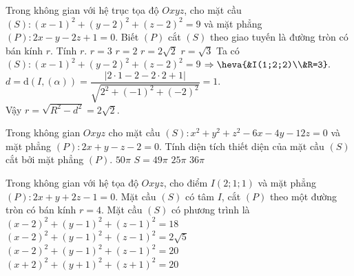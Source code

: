 \begin{ex}%
	Trong không gian với hệ trục tọa độ $Oxyz$, cho mặt cầu $(S) \colon (x-1)^2+(y-2)^2+(z-2)^2=9$ và mặt phẳng $(P) \colon 2x-y-2z+1=0$. Biết $(P)$ cắt $(S)$ theo giao tuyến là đường tròn có bán kính $r$. Tính $r$.
	\choice
	{$r=3$}
	{$r=2$}
	{\True $r=2\sqrt{2}$}
	{$r=\sqrt{3}$}
	\loigiai
	{Ta có $(S) \colon (x-1)^2+(y-2)^2+(z-2)^2=9$ $\Rightarrow \heva{&I(1;2;2)\\&R=3}.$\\ $d=\mathrm{d}\left(I,(\alpha)\right)=\dfrac{|2\cdot1-2-2\cdot2+1|}{\sqrt{2^2+(-1)^2+(-2)^2}}=1.$\\
		Vậy	$r=\sqrt{R^2-d^2}=2\sqrt{2}$.}
\end{ex}

\begin{ex}%
	Trong không gian $Oxyz$ cho mặt cầu $(S)\colon x^2+y^2+z^2-6x-4y-12z=0$ và mặt phẳng $(P)\colon 2x+y-z-2=0$. Tính diện tích thiết diện của mặt cầu $(S)$ cắt bởi mặt phẳng $(P)$.
	\choice
	{$50\pi $}
	{\True $S=49\pi $}
	{$25\pi $}
	{$36\pi $}
\end{ex}

\begin{ex}%
	Trong không gian với hệ tọa độ $Oxyz$, cho điểm $I(2;1;1)$ và mặt phẳng $(P)\colon 2x+y+2z-1=0$. Mặt cầu $(S)$ có tâm $I$, cắt $(P)$ theo một đường tròn có bán kính $r=4$. Mặt cầu $(S)$ có phương trình là
	\choice
	{$(x-2)^2 + (y-1)^2 + (z-1)^2 =18$}
	{$(x-2)^2 + (y-1)^2 +(z-1)^2 = 2\sqrt{5}$}
	{\True $(x-2)^2 + (y-1)^2 + (z-1)^2 =20$}
	{$(x+2)^2 + (y+1)^2 + (z+1)^2 =20$}
\end{ex}

